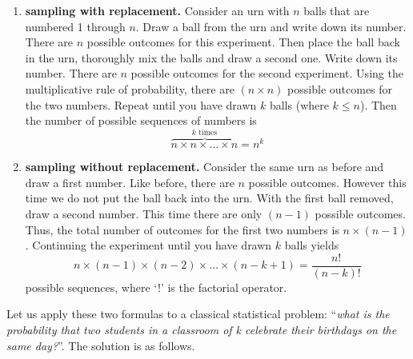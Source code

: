 \begin{enumerate}
\item{\bf sampling with replacement.} Consider an urn with $n$ balls
  that are numbered 1 through $n$. Draw a ball from the urn and write
  down its number. There are $n$ possible outcomes for this
  experiment.  Then place the ball back in the urn, thoroughly mix the
  balls and draw a second one. Write down its number. There are $n$
  possible outcomes for the second experiment. Using the
  multiplicative rule of probability, there are $(n\times{n})$
  possible outcomes for the two numbers. Repeat until you have drawn
  $k$ balls (where $k \leq n$). Then the number of possible
  sequences of numbers is
  \begin{equation}
  \overset{k \mbox{~times}}{\overbrace{n\times{n}\times{\ldots}\times{n}}} = n^k
  \end{equation}
  
\item{\bf sampling without replacement.} Consider the same urn as
  before and draw a first number. Like before, there are $n$ possible
  outcomes.  However this time we do not put the ball back into the
  urn. With the first ball removed, draw a second number. This time
  there are only $(n - 1)$ possible outcomes. Thus, the total number
  of outcomes for the first two numbers is $n \times
  (n-1)$. Continuing the experiment until you have drawn $k$ balls
  yields
  \begin{equation}
  n\times(n-1)\times(n-2)\times{\ldots}\times(n-k+1) = \frac{n!}{(n-k)!}
  \end{equation}
  possible sequences, where `!' is the factorial operator.

\end{enumerate}

Let us apply these two formulas to a classical statistical problem:
``\textit{what is the probability that two students in a classroom of
  k celebrate their birthdays on the same day?}''. The solution is as
follows.

